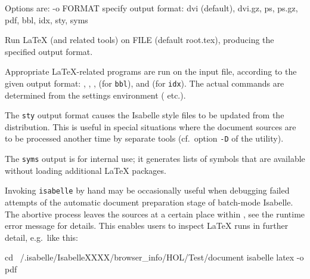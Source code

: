 \begin{isabellebody}
\begin{isamarkuptext}
\begin{ttbox}
  Options are:
    -o FORMAT    specify output format: dvi (default), dvi.gz, ps,
                 ps.gz, pdf, bbl, idx, sty, syms

  Run LaTeX (and related tools) on FILE (default root.tex),
  producing the specified output format.
\end{ttbox}

  Appropriate {\LaTeX}-related programs are run on the input file,
  according to the given output format: \hyperlink{executable.latex}{\mbox{}},
  \hyperlink{executable.pdflatex}{\mbox{}}, \hyperlink{executable.dvips}{\mbox{}}, \hyperlink{executable.bibtex}{\mbox{}}
  (for \verb|bbl|), and \hyperlink{executable.makeindex}{\mbox{}} (for \verb|idx|).  The actual commands are determined from the settings
  environment (\hyperlink{setting.ISABELLE-LATEX}{\mbox{}} etc.).

  The \verb|sty| output format causes the Isabelle style files to
  be updated from the distribution.  This is useful in special
  situations where the document sources are to be processed another
  time by separate tools (cf.\ option \verb|-D| of the \hyperlink{tool.usedir}{\mbox{}} utility).

  The \verb|syms| output is for internal use; it generates lists
  of symbols that are available without loading additional {\LaTeX}
  packages.%
\end{isamarkuptext}%
\isamarkuptrue%
%
\isamarkuptrue%
%
\begin{isamarkuptext}%
Invoking \verb|isabelle| \hyperlink{tool.latex}{\mbox{}} by hand may be
  occasionally useful when debugging failed attempts of the automatic
  document preparation stage of batch-mode Isabelle.  The abortive
  process leaves the sources at a certain place within \hyperlink{setting.ISABELLE-BROWSER-INFO}{\mbox{}}, see the runtime error message for details.
  This enables users to inspect {\LaTeX} runs in further detail, e.g.\
  like this:
\begin{ttbox}
  cd ~/.isabelle/IsabelleXXXX/browser_info/HOL/Test/document
  isabelle latex -o pdf
\end{ttbox}%
\end{isamarkuptext}%
\isamarkuptrue%
%
\isadelimtheory
%
\endisadelimtheory
%
\isatagtheory
{}\isamarkupfalse%
%
\endisatagtheory
{\isafoldtheory}%
%
\isadelimtheory
%
\endisadelimtheory
\end{isabellebody}%
